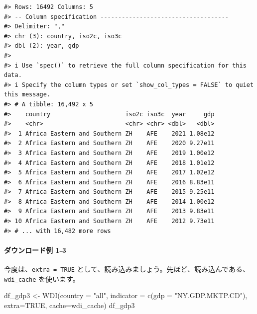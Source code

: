 \documentclass[
]{bxjsbook}
\newenvironment{Shaded}{\begin{snugshade}}{\end{snugshade}}
\newcommand{\AttributeTok}[1]{\textcolor[rgb]{0.77,0.63,0.00}{#1}}
\newcommand{\ConstantTok}[1]{\textcolor[rgb]{0.00,0.00,0.00}{#1}}
\newcommand{\FunctionTok}[1]{\textcolor[rgb]{0.00,0.00,0.00}{#1}}
\newcommand{\NormalTok}[1]{#1}
\newcommand{\OtherTok}[1]{\textcolor[rgb]{0.56,0.35,0.01}{#1}}
\newcommand{\StringTok}[1]{\textcolor[rgb]{0.31,0.60,0.02}{#1}}
\theoremstyle{definition}
\theoremstyle{definition}
\theoremstyle{definition}
\theoremstyle{definition}
\theoremstyle{remark}
\begin{document}
\begin{verbatim}
#> Rows: 16492 Columns: 5
#> -- Column specification ------------------------------------
#> Delimiter: ","
#> chr (3): country, iso2c, iso3c
#> dbl (2): year, gdp
#> 
#> i Use `spec()` to retrieve the full column specification for this data.
#> i Specify the column types or set `show_col_types = FALSE` to quiet this message.
#> # A tibble: 16,492 x 5
#>    country                     iso2c iso3c  year     gdp
#>    <chr>                       <chr> <chr> <dbl>   <dbl>
#>  1 Africa Eastern and Southern ZH    AFE    2021 1.08e12
#>  2 Africa Eastern and Southern ZH    AFE    2020 9.27e11
#>  3 Africa Eastern and Southern ZH    AFE    2019 1.00e12
#>  4 Africa Eastern and Southern ZH    AFE    2018 1.01e12
#>  5 Africa Eastern and Southern ZH    AFE    2017 1.02e12
#>  6 Africa Eastern and Southern ZH    AFE    2016 8.83e11
#>  7 Africa Eastern and Southern ZH    AFE    2015 9.25e11
#>  8 Africa Eastern and Southern ZH    AFE    2014 1.00e12
#>  9 Africa Eastern and Southern ZH    AFE    2013 9.83e11
#> 10 Africa Eastern and Southern ZH    AFE    2012 9.73e11
#> # ... with 16,482 more rows
\end{verbatim}

\hypertarget{ux30c0ux30a6ux30f3ux30edux30fcux30c9ux4f8b-1-3}{%
\paragraph{\texorpdfstring{ダウンロード例 1-3\\
}{ダウンロード例 1-3 }}\label{ux30c0ux30a6ux30f3ux30edux30fcux30c9ux4f8b-1-3}}

今度は、\texttt{extra\ =\ TRUE} として、読み込みましょう。先ほど、読み込んである、\texttt{wdi\_cache} を使います。

\begin{Shaded}
\begin{Highlighting}[]
\NormalTok{df\_gdp3 }\OtherTok{\textless{}{-}} \FunctionTok{WDI}\NormalTok{(}\AttributeTok{country =} \StringTok{"all"}\NormalTok{, }\AttributeTok{indicator =} \FunctionTok{c}\NormalTok{(}\AttributeTok{gdp =} \StringTok{"NY.GDP.MKTP.CD"}\NormalTok{), }
               \AttributeTok{extra=}\ConstantTok{TRUE}\NormalTok{, }\AttributeTok{cache=}\NormalTok{wdi\_cache)}
\NormalTok{df\_gdp3}
\end{Highlighting}
\end{Shaded}
\end{document}
